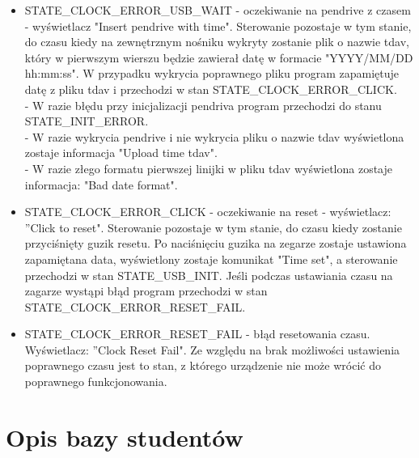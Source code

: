 \documentclass[declaration,shortabstract, mgr]{iithesis}
\begin{document}
\begin{itemize}
\item STATE\_CLOCK\_ERROR\_USB\_WAIT - oczekiwanie na pendrive z czasem - wyświetlacz "Insert pendrive with time". Sterowanie pozostaje w tym stanie, do czasu kiedy na zewnętrznym nośniku wykryty zostanie plik o nazwie tdav, który w pierwszym wierszu będzie zawierał datę w formacie "YYYY/MM/DD hh:mm:ss". W przypadku wykrycia poprawnego pliku program zapamiętuje datę z pliku tdav i przechodzi w stan STATE\_CLOCK\_ERROR\_CLICK.\\
- W razie błędu przy inicjalizacji pendriva program przechodzi do stanu STATE\_INIT\_ERROR. \\
- W razie wykrycia pendrive i nie wykrycia pliku o nazwie tdav wyświetlona zostaje informacja "Upload time tdav".\\
- W razie złego formatu pierwszej linijki w pliku tdav wyświetlona zostaje informacja: "Bad date format".
\item STATE\_CLOCK\_ERROR\_CLICK - oczekiwanie na reset - wyświetlacz: ''Click to reset". Sterowanie pozostaje w tym stanie, do czasu kiedy zostanie przyciśnięty guzik resetu. Po naciśnięciu guzika na zegarze zostaje ustawiona zapamiętana data, wyświetlony zostaje komunikat "Time set", a sterowanie przechodzi w stan STATE\_USB\_INIT. Jeśli podczas ustawiania czasu na zagarze wystąpi błąd program przechodzi w stan STATE\_CLOCK\_ERROR\_RESET\_FAIL.
\item STATE\_CLOCK\_ERROR\_RESET\_FAIL - błąd resetowania czasu. Wyświetlacz: ''Clock Reset Fail". Ze względu na brak możliwości ustawienia poprawnego czasu jest to stan, z którego urządzenie nie może wrócić do poprawnego funkcjonowania.
\end{itemize}

\section{Opis bazy studentów}\label{a:bazastudentów}
\end{document}

